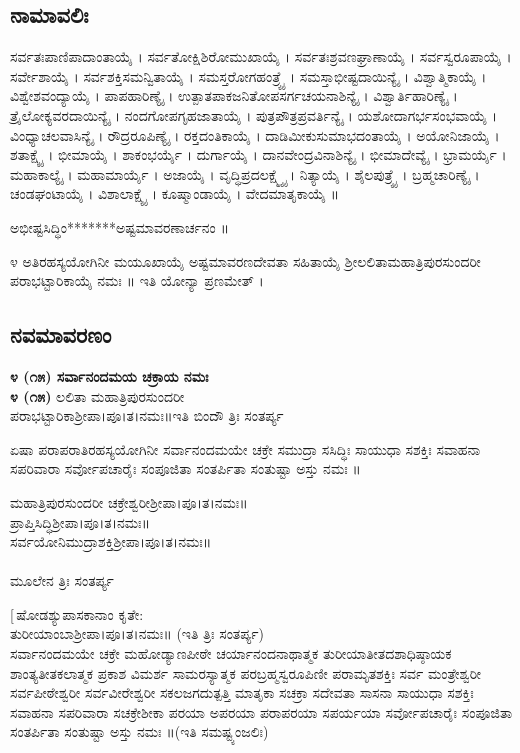 \subsection{ನಾಮಾವಲಿಃ}
ಸರ್ವತಃಪಾಣಿಪಾದಾಂತಾಯೈ । ಸರ್ವತೋಕ್ಷಿಶಿರೋಮುಖಾಯೈ । ಸರ್ವತಃಶ್ರವಣಘ್ರಾಣಾಯೈ । ಸರ್ವಸ್ವರೂಪಾಯೈ । ಸರ್ವೇಶಾಯೈ । ಸರ್ವಶಕ್ತಿಸಮನ್ವಿತಾಯೈ । ಸಮಸ್ತರೋಗಹಂತ್ರ್ಯೈ । ಸಮಸ್ತಾಭೀಷ್ಟದಾಯಿನ್ಯೈ । ವಿಶ್ವಾತ್ಮಿಕಾಯೈ । ವಿಶ್ವೇಶವಂದ್ಯಾಯೈ । ಪಾಪಹಾರಿಣ್ಯೈ । ಉತ್ಪಾತಪಾಕಜನಿತೋಪಸರ್ಗಚಯನಾಶಿನ್ಯೈ । ವಿಶ್ವಾರ್ತಿಹಾರಿಣ್ಯೈ । ತ್ರೈಲೋಕ್ಯವರದಾಯಿನ್ಯೈ । ನಂದಗೋಪಗೃಹಜಾತಾಯೈ । ಪುತ್ರಪೌತ್ರಪ್ರವರ್ತಿನ್ಯೈ । ಯಶೋದಾಗರ್ಭಸಂಭವಾಯೈ । ವಿಂಧ್ಯಾಚಲವಾಸಿನ್ಯೈ । ರೌದ್ರರೂಪಿಣ್ಯೈ । ರಕ್ತದಂತಿಕಾಯೈ । ದಾಡಿಮೀಕುಸುಮಾಭದಂತಾಯೈ । ಅಯೋನಿಜಾಯೈ । ಶತಾಕ್ಷ್ಯೈ । ಭೀಮಾಯೈ । ಶಾಕಂಭರ್ಯೈ । ದುರ್ಗಾಯೈ । ದಾನವೇಂದ್ರವಿನಾಶಿನ್ಯೈ । ಭೀಮಾದೇವ್ಯೈ । ಭ್ರಾಮರ್ಯೈ । ಮಹಾಕಾಲ್ಯೈ । ಮಹಾಮಾರ್ಯೈ । ಅಜಾಯೈ । ವೃದ್ಧಿಪ್ರದಲಕ್ಷ್ಮ್ಯೈ । ನಿತ್ಯಾಯೈ । ಶೈಲಪುತ್ರ್ಯೈ । ಬ್ರಹ್ಮಚಾರಿಣ್ಯೈ । ಚಂಡಘಂಟಾಯೈ । ವಿಶಾಲಾಕ್ಷ್ಯೈ । ಕೂಷ್ಮಾಂಡಾಯೈ । ವೇದಮಾತೃಕಾಯೈ ॥\\

 ಅಭೀಷ್ಟಸಿದ್ಧಿಂ*******ಅಷ್ಟಮಾವರಣಾರ್ಚನಂ ॥

೪ ಅತಿರಹಸ್ಯಯೋಗಿನೀ ಮಯೂಖಾಯೈ ಅಷ್ಟಮಾವರಣದೇವತಾ ಸಹಿತಾಯೈ ಶ್ರೀಲಲಿತಾಮಹಾತ್ರಿಪುರಸುಂದರೀ ಪರಾಭಟ್ಟಾರಿಕಾಯೈ ನಮಃ ॥ ಇತಿ ಯೋನ್ಯಾ ಪ್ರಣಮೇತ್ ।
\subsection{ನವಮಾವರಣಂ}
{\bfseries ೪ (೧೫) ಸರ್ವಾನಂದಮಯ ಚಕ್ರಾಯ ನಮಃ}\\
{\bfseries ೪ (೧೫)} ಲಲಿತಾ ಮಹಾತ್ರಿಪುರಸುಂದರೀ\\ ಪರಾಭಟ್ಟಾರಿಕಾಶ್ರೀಪಾ।ಪೂ।ತ।ನಮಃ॥ಇತಿ ಬಿಂದೌ ತ್ರಿಃ ಸಂತರ್ಪ್ಯ

 ಏಷಾ ಪರಾಪರಾತಿರಹಸ್ಯಯೋಗಿನೀ ಸರ್ವಾನಂದಮಯೇ ಚಕ್ರೇ ಸಮುದ್ರಾ ಸಸಿದ್ಧಿಃ ಸಾಯುಧಾ ಸಶಕ್ತಿಃ ಸವಾಹನಾ ಸಪರಿವಾರಾ ಸರ್ವೋಪಚಾರೈಃ ಸಂಪೂಜಿತಾ ಸಂತರ್ಪಿತಾ ಸಂತುಷ್ಟಾ ಅಸ್ತು ನಮಃ ॥

ಮಹಾತ್ರಿಪುರಸುಂದರೀ ಚಕ್ರೇಶ್ವರೀಶ್ರೀಪಾ।ಪೂ।ತ।ನಮಃ॥\\
 ಪ್ರಾಪ್ತಿಸಿದ್ಧಿಶ್ರೀಪಾ।ಪೂ।ತ।ನಮಃ॥\\
 ಸರ್ವಯೋನಿಮುದ್ರಾಶಕ್ತಿಶ್ರೀಪಾ।ಪೂ।ತ।ನಮಃ॥\\
\\
ಮೂಲೇನ ತ್ರಿಃ ಸಂತರ್ಪ್ಯ

[\,ಷೋಡಶ್ಯುಪಾಸಕಾನಾಂ ಕೃತೇ:\\ 
 ತುರೀಯಾಂಬಾಶ್ರೀಪಾ।ಪೂ।ತ।ನಮಃ॥ (ಇತಿ ತ್ರಿಃ ಸಂತರ್ಪ್ಯ)\\
 ಸರ್ವಾನಂದಮಯೇ ಚಕ್ರೇ ಮಹೋಡ್ಯಾಣಪೀಠೇ ಚರ್ಯಾನಂದನಾಥಾತ್ಮಕ ತುರೀಯಾತೀತದಶಾಧಿಷ್ಠಾಯಕ ಶಾಂತ್ಯತೀತಕಲಾತ್ಮಕ ಪ್ರಕಾಶ ವಿಮರ್ಶ ಸಾಮರಸ್ಯಾತ್ಮಕ ಪರಬ್ರಹ್ಮಸ್ವರೂಪಿಣೀ ಪರಾಮೃತಶಕ್ತಿಃ ಸರ್ವ ಮಂತ್ರೇಶ್ವರೀ ಸರ್ವಪೀಠೇಶ್ವರೀ ಸರ್ವವೀರೇಶ್ವರೀ ಸಕಲಜಗದುತ್ಪತ್ತಿ ಮಾತೃಕಾ ಸಚಕ್ರಾ ಸದೇವತಾ ಸಾಸನಾ ಸಾಯುಧಾ ಸಶಕ್ತಿಃ ಸವಾಹನಾ ಸಪರಿವಾರಾ ಸಚಕ್ರೇಶೀಕಾ ಪರಯಾ ಅಪರಯಾ ಪರಾಪರಯಾ ಸಪರ್ಯಯಾ ಸರ್ವೋಪಚಾರೈಃ ಸಂಪೂಜಿತಾ ಸಂತರ್ಪಿತಾ ಸಂತುಷ್ಟಾ ಅಸ್ತು ನಮಃ ॥(ಇತಿ ಸಮಷ್ಟ್ಯಂಜಲಿಃ)


